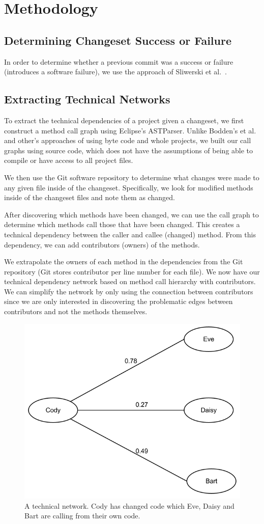\documentclass[conference]{IEEEtran}
\begin{document}
\section{Methodology}

\subsection{Determining Changeset Success or Failure}
In order to determine whether a previous commit was a success or failure (introduces a software
failure), we use the approach of Sliwerski et al.~\cite{Sliwerski:2005:CIF}.

\subsection{Extracting Technical Networks}
To extract the technical dependencies of a project given a changeset, we first construct a method
call graph using Eclipse's ASTParser. 
Unlike  Bodden's et al.~\cite{Bodden:2003:HVJ} and other's approaches of using byte code
and whole projects, we built our call graphs using source code, which does not have the assumptions
of being able to compile or have access to all project files.

We then use the Git software repository to determine what changes were made to any given
file inside of the changeset. Specifically, we look for modified methods inside of the changeset
files and note them as changed.

After discovering which methods have been changed, we can use the call graph to determine
which methods call those that have been changed. This creates a technical dependency between
the caller and callee (changed) method. From this dependency, we can add contributors (owners) 
of the methods.

We extrapolate the owners of each method in the dependencies from the Git repository 
(Git stores contributor per line number for each file).  We now have our technical dependency 
network based on method call hierarchy with contributors. We can simplify the network by 
only using the connection between contributors since we are only interested in discovering the 
problematic edges between contributors and not the methods themselves.

\begin{figure}[tb!]
\centering
\includegraphics[width=0.5\columnwidth]{images/TecNetwork}
\caption{A technical network. Cody has changed code which Eve, Daisy and Bart
are calling from their own code.\label{fig:network}}
\end{figure}
\end{document}

